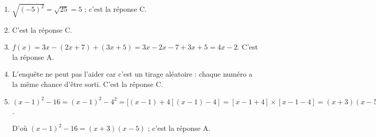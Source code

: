 
\medskip

\begin{enumerate}
\item $\sqrt{(- 5)^2} = \sqrt{25} = 5$ ; c'est la réponse C.
\item  C'est la réponse C.
\item  $f(x)= 3x - (2x + 7) + (3x + 5) = 3x - 2x- 7 + 3x + 5 = 4x - 2$. C'est la réponse A.
\item  L'enquête ne peut pas l'aider car c'est un tirage aléatoire : chaque numéro a la même chance d'être sorti. C'est la réponse C.
\item $(x - 1)^2 - 16 = (x - 1)^2 - 4^2 =[(x - 1) + 4[(x - 1) - 4]  = [x - 1+4] \times [x - 1 - 4] = (x + 3)(x - 5)$.

D'où $(x - 1)^2 - 16 = (x + 3)(x - 5)$ ; c'est la réponse A.
\end{enumerate}
 
\vspace{0,5cm}

